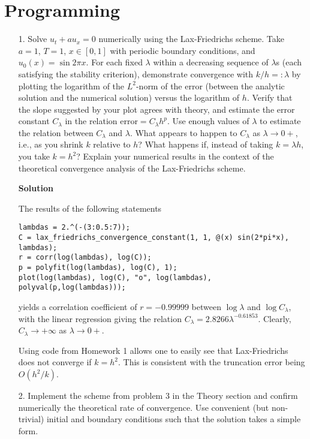 \documentclass{article}
\begin{document}
\section{Programming}

\begin{itemize}

\item[1.] Solve $u_t + a u_x = 0$ numerically using the Lax-Friedrichs scheme. Take $a = 1$, $T = 1$, $x \in [0,1]$ with periodic boundary conditions, and $u_0(x) = \sin 2 \pi x$. For each fixed $\lambda$ within a decreasing sequence of $\lambda$s (each satisfying the stability criterion), demonstrate convergence with $k/h =: \lambda$ by plotting the logarithm of the $L^2$-norm of the error (between the analytic solution and the numerical solution) versus the logarithm of $h$. Verify that the slope suggested by your plot agrees with theory, and estimate the error constant $C_{\lambda}$ in the relation $\text{error} = C_{\lambda} h^p$. Use enough values of $\lambda$ to estimate the relation between $C_{\lambda}$ and $\lambda$. What appears to happen to $C_{\lambda}$ as $\lambda \to 0+$, i.e., as you shrink $k$ relative to $h$? What happens if, instead of taking $k = \lambda h$, you take $k = h^2$? Explain your numerical results in the context of the theoretical convergence analysis of the Lax-Friedrichs scheme.

\textbf{Solution}

The results of the following statements
\begin{verbatim}
lambdas = 2.^(-(3:0.5:7));
C = lax_friedrichs_convergence_constant(1, 1, @(x) sin(2*pi*x), lambdas);
r = corr(log(lambdas), log(C));
p = polyfit(log(lambdas), log(C), 1);
plot(log(lambdas), log(C), "o", log(lambdas), polyval(p,log(lambdas)));
\end{verbatim}
yields a correlation coefficient of $r = -0.99999$ between $\log \lambda$ and $\log C_{\lambda}$, with the linear regression giving the relation $C_{\lambda} = 2.8266 \lambda^{-0.61853}$. Clearly, $C_{\lambda} \to +\infty$ as $\lambda \to 0+$.

Using code from Homework 1 allows one to easily see that Lax-Friedrichs does not converge if $k = h^2$. This is consistent with the truncation error being $O \left( h^2 / k \right)$.

\item[2.] Implement the scheme from problem 3 in the Theory section and confirm numerically the theoretical rate of convergence. Use convenient (but non-trivial) initial and boundary conditions such that the solution takes a simple form.


\end{itemize}
\end{document}
